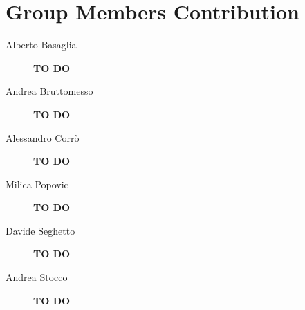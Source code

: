 \section{Group Members Contribution}


\begin{description}
	\item[Alberto Basaglia] \textbf{TO DO}
	\item[Andrea Bruttomesso] \textbf{TO DO}
	\item[Alessandro Corrò] \textbf{TO DO}
	\item[Milica Popovic] \textbf{TO DO}
	\item[Davide Seghetto] \textbf{TO DO}
	\item[Andrea Stocco] \textbf{TO DO}
\end{description}
